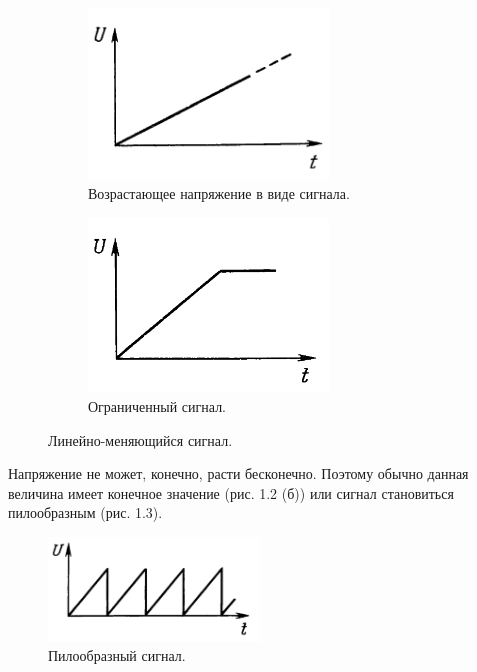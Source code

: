 \begin{figure}[H]
     \begin{subfigure}[H]{0.45\textwidth}
         \centering
         \includegraphics[width=0.70\textwidth]{../image/s_la.png}
         \caption{Возрастающее напряжение в виде сигнала.}
     \end{subfigure}
     \hfill
     \begin{subfigure}[H]{0.45\textwidth}
         \centering
         \includegraphics[width=0.70\textwidth]{../image/s_lb.png}
         \caption{Ограниченный сигнал.}
     \end{subfigure}
        \caption{Линейно-меняющийся сигнал.}
\end{figure}

Напряжение не может, конечно, расти бесконечно. Поэтому обычно данная величина имеет конечное значение (рис. 1.2 (б)) или сигнал становиться пилообразным (рис. 1.3).

	\begin{figure}[H]
    \centering
    \includegraphics[width=0.5\textwidth]{../image/s_saw.png}
    \caption{Пилообразный сигнал.}
	\end{figure}

